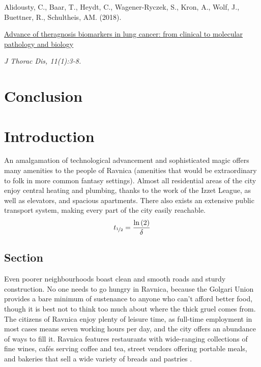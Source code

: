 \begin{tcolorbox}[
  boxrule=0pt, leftrule=1pt, colframe=s-blue, colback=white, sharp corners=all]%
  \raggedright
  Alidousty, C., Baar, T., Heydt, C., Wagener-Ryczek, S., Kron, A., Wolf, J.,
  Buettner, R., Schultheis, AM. (2018).
  
  \smallskip
  \href{http://jtd.amegroups.com/article/view/25843}
    {Advance of theragnosis biomarkers in lung cancer: from clinical to
    molecular pathology and biology}

  \smallskip
  \textit{J Thorac Dis, 11(1):3-8.}
\end{tcolorbox}


\chapter{Conclusion}


\chapter*{Introduction}
An amalgamation of technological advancement and sophisticated magic offers many 
amenities to the people of Ravnica (amenities that would be extraordinary to
folk in more common fantasy settings). Almost all residential areas of the city
enjoy central heating and plumbing, thanks to the work of the Izzet League, as
well as elevators, and spacious apartments. There also exists an extensive
public transport system, making every part of the city easily reachable.
\begin{align*}
t_{\nicefrac{1}{2}}=\frac{\ln\left(2\right)}{\delta}
\end{align*}

\section*{Section}
Even poorer neighbourhoods boast clean and smooth roads and sturdy construction.
No one needs to go hungry in Ravnica, because the Golgari Union provides a bare
minimum of  sustenance to anyone who can't afford better food, though it is best
not to think too much about where the thick gruel comes from. The citizens of
Ravnica enjoy plenty of leisure time, as full-time employment in most cases
means seven working hours per day, and the city offers an abundance of ways to
fill it. Ravnica features restaurants with wide-ranging collections of fine
wines, cafés serving coffee and tea, street vendors offering portable meals, and
bakeries that sell a wide variety of breads and pastries \citep{Reich2013}.

